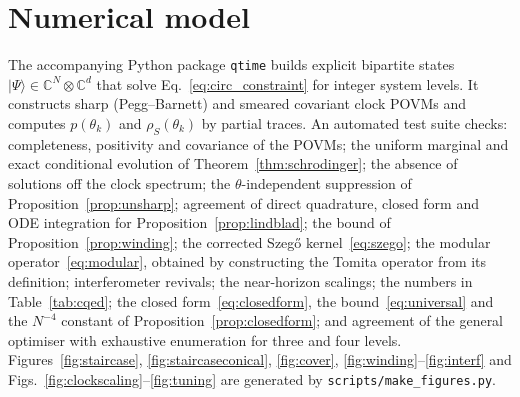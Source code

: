 \documentclass[aps,prd,onecolumn,notitlepage,10pt,amsmath,amssymb,amsfonts,nofootinbib]{revtex4-2}
\theoremstyle{definition}
\theoremstyle{remark}
\newcommand{\C}{\mathbb{C}}
\begin{document}
\section{Numerical model}
\label{app:numerics}
The accompanying Python package \texttt{qtime} builds explicit bipartite states $|\Psi\rangle\in\C^N\otimes\C^d$ that solve Eq.~\eqref{eq:circ_constraint} for integer system levels. It constructs sharp (Pegg--Barnett) and smeared covariant clock POVMs and computes $p(\theta_k)$ and $\rho_S(\theta_k)$ by partial traces. An automated test suite checks: completeness, positivity and covariance of the POVMs; the uniform marginal and exact conditional evolution of Theorem~\ref{thm:schrodinger}; the absence of solutions off the clock spectrum; the $\theta$-independent suppression of Proposition~\ref{prop:unsharp}; agreement of direct quadrature, closed form and ODE integration for Proposition~\ref{prop:lindblad}; the bound of Proposition~\ref{prop:winding}; the corrected Szeg\H{o} kernel~\eqref{eq:szego}; the modular operator~\eqref{eq:modular}, obtained by constructing the Tomita operator from its definition; interferometer revivals; the near-horizon scalings; the numbers in Table~\ref{tab:cqed}; the closed form~\eqref{eq:closedform}, the bound~\eqref{eq:universal} and the $N^{-4}$ constant of Proposition~\ref{prop:closedform}; and agreement of the general optimiser with exhaustive enumeration for three and four levels. Figures~\ref{fig:staircase}, \ref{fig:staircaseconical}, \ref{fig:cover}, \ref{fig:winding}--\ref{fig:interf} and Figs.~\ref{fig:clockscaling}--\ref{fig:tuning} are generated by \texttt{scripts/make\_figures.py}. 
\end{document}

